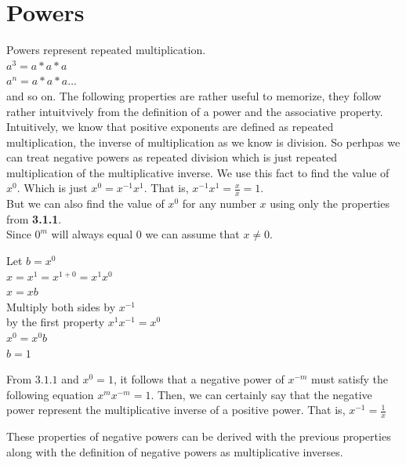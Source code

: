 \documentclass[12pt]{report}
\begin{document}
\section{Powers}

Powers represent repeated multiplication.\medskip\\
$a^3=a*a*a$\\
$a^n=a*a*a\dots$\\
and so on.
The following properties are rather useful to memorize, they follow rather intuitvively from the definition of a power and the associative property.
Intuitively, we know that positive exponents are defined as repeated multiplication, the inverse of multiplication as we know is division. So perhpas we can treat negative powers as repeated division which is just repeated multiplication of the multiplicative inverse. We use this fact to find the value of $x^0$. Which is just $x^0=x^{-1}x^1$. That is, $x^{-1}x^1=\frac{x}{x}=1$.\\
But we can also find the value of $x^0$ for any number $x$ using only the properties from \textbf{3.1.1}.\\
Since $0^m$ will always equal 0 we can assume that $x\neq 0$.

\noindent Let $b=x^0$\smallskip\\
$x=x^1=x^{1+0}=x^{1}x^{0}$\\
$x=xb$\\
Multiply both sides by $x^{-1}$\\
by the first property $x^1x^{-1}=x^0$\\
$x^0=x^0b$\\
$b=1$

From $3.1.1$ and $x^0=1$, it follows that a negative power of $x^{-m}$ must satisfy the following equation $x^m x^{-m}=1$. Then, we can certainly say that the negative power represent the multiplicative inverse of a positive power. That is, $x^{-1}=\frac{1}{x}$\medskip

These properties of negative powers can be derived with the previous properties along with the definition of negative powers as multiplicative inverses.
\end{document}
